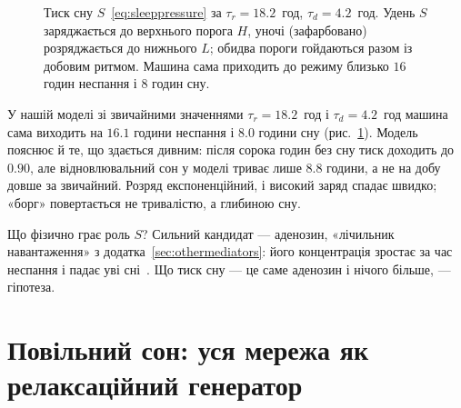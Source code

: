 \begin{figure}[t]
\centering
{}
\caption{Тиск сну $S$~\eqref{eq:sleeppressure} за $\tau_r=18.2$~год, $\tau_d=4.2$~год. Удень $S$ заряджається до верхнього порога $H$, уночі (зафарбовано) розряджається до нижнього $L$; обидва пороги гойдаються разом із добовим ритмом. Машина сама приходить до режиму близько $16$ годин неспання і $8$ годин сну.}
\label{fig:twoprocess}
\end{figure}

У нашій моделі зі звичайними значеннями $\tau_r=18.2$~год і $\tau_d=4.2$~год машина сама виходить на $16.1$ години неспання і $8.0$ години сну (рис.~\ref{fig:twoprocess}). Модель пояснює й те, що здається дивним: після сорока годин без сну тиск доходить до $0.90$, але відновлювальний сон у моделі триває лише $8.8$ години, а не на добу довше за звичайний. Розряд експоненційний, і високий заряд спадає швидко; «борг» повертається не тривалістю, а глибиною сну.

Що фізично грає роль $S$? Сильний кандидат --- аденозин, «лічильник навантаження» з додатка~\ref{sec:othermediators}: його концентрація зростає за час неспання і падає уві сні~\cite{PorkkaHeiskanen1997,Dunwiddie2001}. Що тиск сну --- це саме аденозин і нічого більше, --- гіпотеза.

\section{Повільний сон: уся мережа як релаксаційний генератор}

